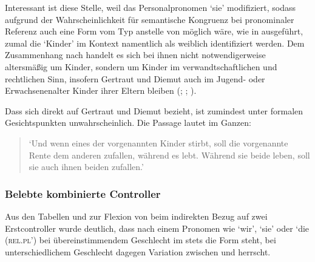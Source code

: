Interessant ist diese Stelle, weil  das Personalpronomen 
`sie' modifiziert, sodass aufgrund der Wahrscheinlichkeit für semantische
Kongruenz bei pronominaler Referenz auch eine Form vom Typ 
anstelle von  möglich wäre, wie in 
ausgeführt, zumal die  `Kinder' im Kontext namentlich als weiblich
identifiziert werden. Dem Zusammenhang nach handelt es sich bei ihnen nicht
notwendigerweise altersmäßig um Kinder, sondern um Kinder im
verwandt\-schaft\-lichen und rechtlichen Sinn, insofern Gertraut und Diemut
auch im Jugend- oder Erwachsenen\-alter Kinder ihrer Eltern bleiben
(\cites(Nr.~2960)[240,31+35]{cao4};
\cites(Nr.~2719)[vgl.~auch][96,40--97,18]{cao4}; \cite[569, 619]{caor}).

Dass sich  direkt auf Gertraut und Diemut bezieht, ist
zumindest unter formalen Gesichtspunkten unwahrscheinlich. Die Passage lautet
im Ganzen:

\begin{quote}
	 \autocites(Nr.~2960)[240,37--39]{cao4}

`Und wenn eines der vorgenannten Kinder
stirbt, soll die vorgenannte Rente dem anderen zufallen, während es lebt.
Während sie beide leben, soll sie auch ihnen beiden zufallen.'
\end{quote}

\subsubsection{Belebte kombinierte Controller}

Aus den Tabellen  und  zur
Flexion von  beim indirekten Bezug auf zwei Erstcontroller wurde
deutlich, dass nach einem Pronomen wie  `wir',  `sie' oder
 `die (\textsc{rel.pl')} bei übereinstimmendem Geschlecht im \CAO{}
stets die Form  steht, bei unterschiedlichem Geschlecht dagegen
Variation zwischen   und 
 herrscht.

